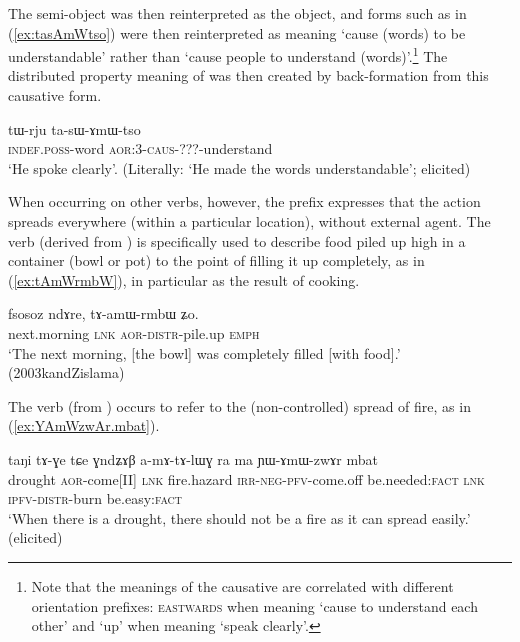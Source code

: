 The semi-object was then reinterpreted as the object, and forms such as  in (\ref{ex:tasAmWtso}) were then reinterpreted as meaning `cause (words) to be understandable' rather than `cause people to understand (words)'.\footnote{Note that the meanings of the causative  are correlated with different orientation prefixes: \textsc{eastwards} when meaning `cause to understand each other' and `up' when meaning `speak clearly'. } The distributed property meaning of  was then created by back-formation from this causative form.

\begin{exe}
\ex \label{ex:tasAmWtso}
 \gll tɯ-rju ta-sɯ-ɤmɯ-tso \\
 \textsc{indef}.\textsc{poss}-word \textsc{aor}:3\flobv{}-\textsc{caus}-???-understand \\
 \glt `He spoke clearly'. (Literally: `He made the words understandable'; elicited)
 \end{exe}

When occurring on other verbs, however, the  prefix expresses that the action spreads everywhere (within a particular location), without external agent. The verb  (derived from ) is specifically used to describe food piled up high in a container (bowl or pot) to the point of filling it up completely, as in (\ref{ex:tAmWrmbW}), in particular as the result of cooking.
 
 \begin{exe}
\ex \label{ex:tAmWrmbW}
 \gll fsosoz ndɤre, tɤ-amɯ-rmbɯ ʑo. \\
 next.morning \textsc{lnk} \textsc{aor}-\textsc{distr}-pile.up \textsc{emph} \\
\glt `The next morning, [the bowl] was completely filled [with food].' (2003kandZislama)
 \end{exe}

The verb  (from ) occurs to refer to the (non-controlled) spread of fire, as in (\ref{ex:YAmWzwAr.mbat}).  

 \begin{exe}
\ex \label{ex:YAmWzwAr.mbat}
 \gll taŋi tɤ-ɣe tɕe ɣndʑɤβ a-mɤ-tɤ-lɯɣ ra ma ɲɯ-ɤmɯ-zwɤr mbat \\
 drought \textsc{aor}-come[II] \textsc{lnk} fire.hazard \textsc{irr}-\textsc{neg}-\textsc{pfv}-come.off be.needed:\textsc{fact} \textsc{lnk} \textsc{ipfv}-\textsc{distr}-burn be.easy:\textsc{fact} \\
 \glt  `When there is a drought, there should not be a fire as it can spread easily.' (elicited)
  \end{exe}


